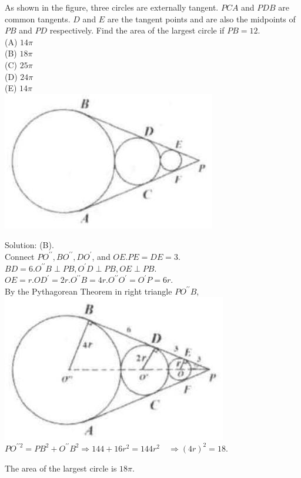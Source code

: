 \documentclass{article}
\begin{document}
As shown in the figure, three circles are externally tangent. \(P C A\) and \(P D B\) are common tangents. \(D\) and \(E\) are the tangent points and are also the midpoints of \(P B\) and \(P D\) respectively. Find the area of the largest circle if \(P B=12\).\\
(A) \(14 \pi\)\\
(B) \(18 \pi\)\\
(C) \(25 \pi\)\\
(D) \(24 \pi\)\\
(E) \(14 \pi\)\\
\centering
\includegraphics[width=\textwidth]{images/176(3).jpg}

Solution: (B).\\
Connect \(P O^{\prime \prime}, B O^{\prime \prime}, D O^{\prime}\), and \(O E . P E=D E=3\).\\
\(B D=6 . O^{\prime \prime} B \perp P B, O^{\prime} D \perp P B, O E \perp P B\).\\
\(O E=r . O D^{\prime}=2 r . O^{\prime \prime} B=4 r . O^{\prime \prime} O^{\prime}=O^{\prime} P=6 r\).\\
By the Pythagorean Theorem in right triangle \(P O^{\prime \prime} B\),\\
\centering
\includegraphics[width=\textwidth]{images/176(1).jpg}\\
\(P O^{\prime \prime 2}=P B^{2}+O^{\prime \prime} B^{2} \Rightarrow 144+16 r^{2}=144 r^{2} \quad \Rightarrow(4 r)^{2}=18\).


The area of the largest circle is \(18 \pi\).\\
\end{document}
